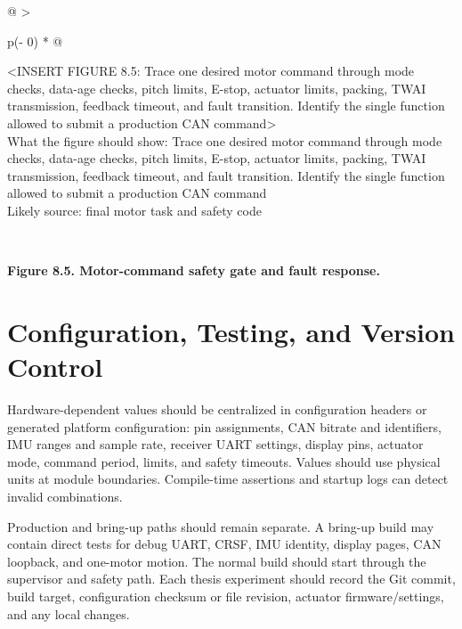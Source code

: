 \begin{longtable}[]{@{}
  >{\raggedright\arraybackslash}p{(\columnwidth - 0\tabcolsep) * }@{}}
\toprule\noalign{}
\begin{minipage}[b]{\linewidth}\raggedright
\textless INSERT FIGURE 8.5: Trace one desired motor command through
mode checks, data-age checks, pitch limits, E-stop, actuator limits,
packing, TWAI transmission, feedback timeout, and fault transition.
Identify the single function allowed to submit a production CAN
command\textgreater{}\\
What the figure should show: Trace one desired motor command through
mode checks, data-age checks, pitch limits, E-stop, actuator limits,
packing, TWAI transmission, feedback timeout, and fault transition.
Identify the single function allowed to submit a production CAN
command\\
Likely source: final motor task and safety code\strut
\end{minipage} \\
\midrule\noalign{}
\endhead
\bottomrule\noalign{}
\endlastfoot
\end{longtable}

\begin{center}\singlespacing
{}
\textbf{Figure 8.5. Motor-command safety gate and fault response.}
\end{center}

\section{Configuration, Testing, and Version Control}\label{configuration-testing-and-version-control}

Hardware-dependent values should be centralized in configuration headers
or generated platform configuration: pin assignments, CAN bitrate and
identifiers, IMU ranges and sample rate, receiver UART settings, display
pins, actuator mode, command period, limits, and safety timeouts. Values
should use physical units at module boundaries. Compile-time assertions
and startup logs can detect invalid combinations.

Production and bring-up paths should remain separate. A bring-up build
may contain direct tests for debug UART, CRSF, IMU identity, display
pages, CAN loopback, and one-motor motion. The normal build should start
through the supervisor and safety path. Each thesis experiment should
record the Git commit, build target, configuration checksum or file
revision, actuator firmware\slash{}settings, and any local changes.

